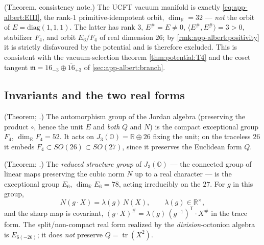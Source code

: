 \begin{remark}\label{rmk:app-albert:vacuum}
\textup{(Theorem, consistency note.)}
The UCFT vacuum manifold is exactly \eqref{eq:app-albert:EIII}, the rank-$1$
primitive-idempotent orbit, $\dim_{\mathbb R}=32$ --- \emph{not} the orbit of
$E=\mathrm{diag}(1,1,1)$. The latter has rank $3$, $E^\#=E\neq0$,
$\langle E^\#,E^\#\rangle=3>0$, stabilizer $F_4$, and orbit $E_6/F_4$ of real
dimension $26$; by \autoref{rmk:app-albert:positivity} it is strictly disfavoured
by the potential and is therefore excluded. This is consistent with the
vacuum-selection theorem \autoref{thm:potential:T4} and the coset tangent
$\mathfrak m=16_{-3}\oplus\overline{16}_{+3}$ of \autoref{sec:app-albert:branch}.
\end{remark}

\subsection{Invariants and the two real forms}
\label{sec:app-albert:invariants}

\begin{theorem}[$F_4=\mathrm{Aut}(J_3(\mathbb O))$]\label{thm:app-albert:F4}
\textup{(Theorem; \cite{Schafer:1966,Yokota:2009}.)}
The automorphism group of the Jordan algebra (preserving the product $\circ$,
hence the unit $E$ and \emph{both} $Q$ and $N$) is the compact exceptional group
$F_4$, $\dim_{\mathbb R}F_4=52$. It acts on $J_3(\mathbb O)=\mathbb R\oplus 26$
fixing the unit; on the traceless $26$ it embeds $F_4\subset SO(26)\subset
SO(27)$, since it preserves the Euclidean form $Q$.
\end{theorem}

\begin{theorem}[Reduced structure group $=E_6$]\label{thm:app-albert:E6}
\textup{(Theorem; \cite{Jacobson:1968,Springer:2000}.)}
The \emph{reduced structure group} of $J_3(\mathbb O)$ --- the connected group of
linear maps preserving the cubic norm $N$ up to a real character --- is the
exceptional group $E_6$, $\dim_{\mathbb R}E_6=78$, acting irreducibly on the $27$.
For $g$ in this group,
\begin{equation}\label{eq:app-albert:character}
  N(g\cdot X)=\lambda(g)\,N(X),\qquad \lambda(g)\in\mathbb R^\times,
\end{equation}
and the sharp map is covariant, $(g\cdot X)^\#=\lambda(g)\,(g^{-1})^{\mathsf T}\!
\cdot X^\#$ in the trace form. The split/non-compact real form realized by the
\emph{division}-octonion algebra is $E_{6(-26)}$; it does \emph{not} preserve
$Q=\operatorname{tr}(X^2)$.
\end{theorem}

